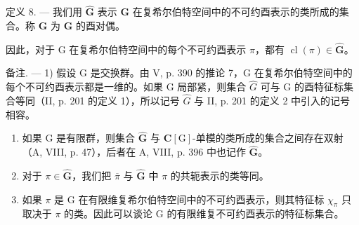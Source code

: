 定义 8. --- 我们用 \(\widehat{\mathbf{G}}\) 表示 \(\mathbf{G}\) 在复希尔伯特空间中的不可约酉表示的类所成的集合。称 \(\widehat{\mathbf{G}}\) 为 \(\mathbf{G}\) 的酉对偶。

因此，对于 G 在复希尔伯特空间中的每个不可约酉表示 \(\pi\)，都有 \(\operatorname{cl}(\pi) \in \widehat{\mathbf{G}}\)。

备注. --- 1) 假设 G 是交换群。由 V, p. 390 的推论 7，G 在复希尔伯特空间中的每个不可约酉表示都是一维的。如果 G 局部紧，则集合 \(\widehat{G}\) 可与 G 的酉特征标集合等同（II, p. 201 的定义 1），所以记号 \(\widehat{G}\) 与 II, p. 201 的定义 2 中引入的记号相容。

\begin{enumerate}
\def\labelenumi{\arabic{enumi})}
\setcounter{enumi}{1}
\item
  如果 G 是有限群，则集合 \(\widehat{\mathbf{G}}\) 与 \(\mathbf{C}[\mathrm{G}]\)-单模的类所成的集合之间存在双射（A, VIII, p. 47），后者在 A, VIII, p. 396 中也记作 \(\widehat{\mathbf{G}}\)。
\item
  对于 \(\pi \in \widehat{\mathbf{G}}\)，我们把 \(\overline{\pi}\) 与 \(\widehat{\mathbf{G}}\) 中 \(\pi\) 的共轭表示的类等同。
\item
  如果 \(\pi\) 是 G 在有限维复希尔伯特空间中的不可约酉表示，则其特征标 \(\chi_{\pi}\) 只取决于 \(\pi\) 的类。因此可以谈论 G 的有限维复不可约酉表示的特征标集合。
\end{enumerate}

